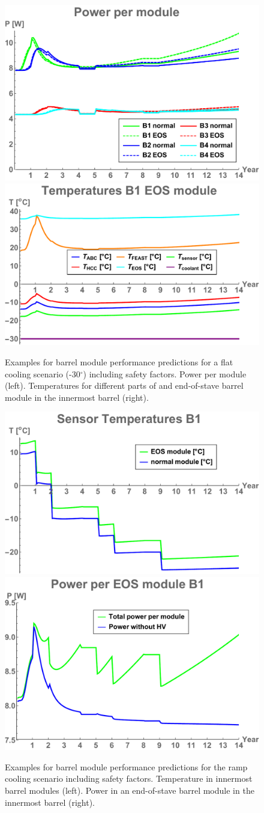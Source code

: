 \begin{figure}[ht]
\centering
\includegraphics[width=0.4\linewidth]{figures/powerpermodule.pdf}\quad\quad
\includegraphics[width=0.4\linewidth]{figures/Teosmodule.pdf}
\caption{Examples for barrel module performance predictions for a flat cooling scenario (-30$^\circ$) including safety factors. Power per module (left). Temperatures for different parts of and end-of-stave barrel module in the innermost barrel (right).}
\label{fig:moduleflatperformance}
\end{figure}

\begin{figure}[ht]
\centering
\includegraphics[width=0.4\linewidth]{figures/Tmodule.pdf}\quad\quad
\includegraphics[width=0.4\linewidth]{figures/Peosmodule.pdf}
\caption{Examples for barrel module performance predictions for the ramp cooling scenario including safety factors. Temperature in innermost barrel modules (left). Power in an end-of-stave barrel module in the innermost barrel (right).}
\label{fig:modulerampperformance}
\end{figure}


